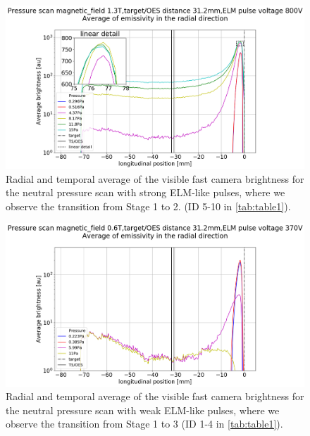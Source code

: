\begin{figure}
	\centering
	\includegraphics[width=0.7\linewidth,trim={110 0 170 85},clip]{Chapters/chapter3/figs/20.png}
	\caption{Radial and temporal average of the visible fast camera brightness for the neutral pressure scan with strong ELM-like pulses, where we observe the transition from Stage 1 to 2. (ID 5-10 in \autoref{tab:table1}).}
	\label{fig:ELM2}
\end{figure}

\begin{figure}
	\centering
	\includegraphics[width=0.7\linewidth,trim={110 0 170 85},clip]{Chapters/chapter3/figs/39.png}
	\caption{Radial and temporal average of the visible fast camera brightness for the neutral pressure scan with weak ELM-like pulses, where we observe the transition from Stage 1 to 3 (ID 1-4 in \autoref{tab:table1}).}
	\label{fig:ELM3}
\end{figure}


